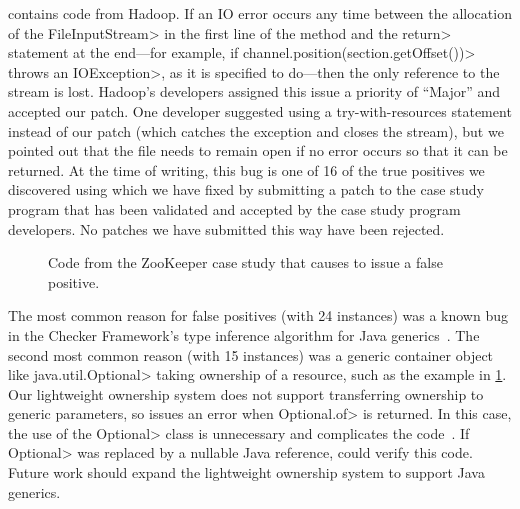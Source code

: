  contains code from Hadoop. If an IO error
occurs any time between the allocation of the \<FileInputStream>
in the first line of the method and the \<return> statement
at the end---for example, if \<channel.position(section.getOffset())>
throws an \<IOException>, as it is specified to do---then the
only reference to the stream is lost. Hadoop's developers
assigned this issue a priority of ``Major'' and accepted our
patch.
One developer suggested using a try-with-resources statement instead
of our patch (which catches the exception and closes the stream),
but we pointed out that
the file needs to remain open if no error occurs so that it can be
returned.
 At the time of writing, this bug is one of 16 of the true
positives we discovered using \tool which we have fixed by submitting
a patch to the case study program that has been validated and accepted
by the case study program developers. No patches we have submitted this way
have been rejected.

\begin{figure}
  
  \prefigcaption
  \caption{Code from the ZooKeeper case study that causes \tool
  to issue a false positive.}
  \label{fig:zookeeper-optional}
\end{figure}

The most common reason for false
positives (with 24 instances) was
a known bug in the Checker Framework’s
type inference algorithm for Java generics~\cite{issue979}.
The second most common reason (with 15 instances)
was a generic container object like \<java.util.Optional> taking ownership of a resource, such
as the example in \cref{fig:zookeeper-optional}. Our lightweight ownership
system does not support transferring ownership to generic parameters,
so \tool issues an error when \<Optional.of> is returned. In this case, the use
of the \<Optional> class is unnecessary and complicates the
code~\cite{ErnstNothingIsBetterThanOptional}.  If \<Optional> was replaced
by a nullable Java reference,
\tool could verify this code. Future work should expand the lightweight ownership system to
support Java generics.

